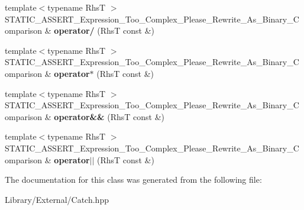 \begin{DoxyCompactItemize}
\item 
\hypertarget{class_catch_1_1_expression_lhs_a37d50565046ac9b1c9159a7c0cf88a1e}{}{\footnotesize template$<$typename Rhs\+T $>$ }\\S\+T\+A\+T\+I\+C\+\_\+\+A\+S\+S\+E\+R\+T\+\_\+\+Expression\+\_\+\+Too\+\_\+\+Complex\+\_\+\+Please\+\_\+\+Rewrite\+\_\+\+As\+\_\+\+Binary\+\_\+\+Comparison \& {\bfseries operator/} (Rhs\+T const \&)\label{class_catch_1_1_expression_lhs_a37d50565046ac9b1c9159a7c0cf88a1e}

\item 
\hypertarget{class_catch_1_1_expression_lhs_a9a94294c22449f62087862ef911e6291}{}{\footnotesize template$<$typename Rhs\+T $>$ }\\S\+T\+A\+T\+I\+C\+\_\+\+A\+S\+S\+E\+R\+T\+\_\+\+Expression\+\_\+\+Too\+\_\+\+Complex\+\_\+\+Please\+\_\+\+Rewrite\+\_\+\+As\+\_\+\+Binary\+\_\+\+Comparison \& {\bfseries operator$\ast$} (Rhs\+T const \&)\label{class_catch_1_1_expression_lhs_a9a94294c22449f62087862ef911e6291}

\item 
\hypertarget{class_catch_1_1_expression_lhs_a7f022056ef4f25e716ab85846be6229f}{}{\footnotesize template$<$typename Rhs\+T $>$ }\\S\+T\+A\+T\+I\+C\+\_\+\+A\+S\+S\+E\+R\+T\+\_\+\+Expression\+\_\+\+Too\+\_\+\+Complex\+\_\+\+Please\+\_\+\+Rewrite\+\_\+\+As\+\_\+\+Binary\+\_\+\+Comparison \& {\bfseries operator\&\&} (Rhs\+T const \&)\label{class_catch_1_1_expression_lhs_a7f022056ef4f25e716ab85846be6229f}

\item 
\hypertarget{class_catch_1_1_expression_lhs_a6932b72da79d6c6b03d867772ceac61b}{}{\footnotesize template$<$typename Rhs\+T $>$ }\\S\+T\+A\+T\+I\+C\+\_\+\+A\+S\+S\+E\+R\+T\+\_\+\+Expression\+\_\+\+Too\+\_\+\+Complex\+\_\+\+Please\+\_\+\+Rewrite\+\_\+\+As\+\_\+\+Binary\+\_\+\+Comparison \& {\bfseries operator$\vert$$\vert$} (Rhs\+T const \&)\label{class_catch_1_1_expression_lhs_a6932b72da79d6c6b03d867772ceac61b}

\end{DoxyCompactItemize}


The documentation for this class was generated from the following file\+:\begin{DoxyCompactItemize}
\item 
Library/\+External/Catch.\+hpp\end{DoxyCompactItemize}

